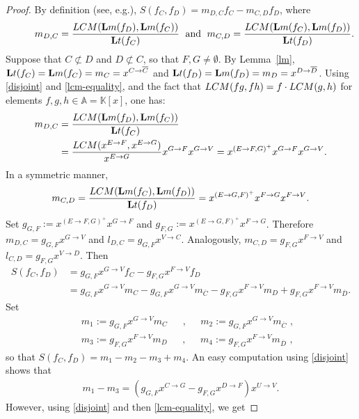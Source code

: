 \documentclass[10pt]{amsart}
\newcommand{\eg}{e.g.}
\newcommand{\mbk}{\mbox{$\mathbb{K}$}}
\newcommand{\mba}{\mbox{$\mathbb{A}$}}
\newcommand{\lm}{\mbox{${\bf L}{\rm m}$}}
\newcommand{\lt}{\mbox{${\bf L}{\rm t}$}}
\newcommand{\Lcm}{\mbox{${\rm LCM}$}}
\theoremstyle{definition}
\theoremstyle{remark}
\begin{document}
\begin{proof}
By definition (see, \eg \cite[\S~2.6, Definition~4]{clo}),
$S(f_C,f_D)=m_{D,C}f_C-m_{C,D}f_D$, where
\begin{eqnarray}\label{mdc}
\phantom{+++} m_{D,C}=\frac{\Lcm(\lm(f_D),\lm(f_C))}{\lt(f_C)}\;
\mbox{ and }\; m_{C,D}=\frac{\Lcm(\lm(f_C),\lm(f_D))}{\lt(f_D)}.
\end{eqnarray}
Suppose that $C\not\subset D$ and $D\not\subset C$, so that
$F,G\neq\emptyset$. By Lemma~\ref{lm},
$\lt(f_C)=\lm(f_C)=m_C=x^{C\to\overline{C}}$ and
$\lt(f_D)=\lm(f_D)=m_D=x^{D\to\overline{D}}$. Using \eqref{disjoint}
and \eqref{lcm-equality}, and the fact that $\Lcm(fg,fh)=f\cdot
\Lcm(g,h)$ for elements $f,g,h\in \mba=\mbk[x]$, one has:
\begin{align}\label{lcmCD/C}
m_{D,C} & =\frac{\Lcm(\lm(f_D),\lm(f_C))}{\lt(f_C)}\\ &=
  \frac{\Lcm(x^{E\to F},x^{E\to G})}{x^{E\to G}}x^{G\to F}x^{G\to
    V}=x^{(E\to F,G)^{+}}x^{G\to F}x^{G\to V}. \notag
\end{align}
In a symmetric manner,
\begin{eqnarray}\label{lcmCD/D}
m_{C,D}=\frac{\Lcm(\lm(f_C),\lm(f_D))}{\lt(f_D)}=x^{(E\to
  G,F)^{+}}x^{F\to G}x^{F\to V}.
\end{eqnarray}
Set $g_{G,F}:=x^{(E\to F,G)^{+}}x^{G\to F}$ and $g_{F,G}:=x^{(E\to
  G,F)^{+}}x^{F\to G}$. Therefore $m_{D,C}=g_{G,F}x^{G\to V}$ and
$l_{D,C}=g_{G,F}x^{V\to C}$. Analogously, $m_{C,D}=g_{F,G}x^{F\to V}$
and $l_{C,D}=g_{F,G}x^{V\to D}$. Then
\begin{align*}
 S(f_C,f_D)&=g_{G,F}x^{G\to V}f_C-g_{F,G}x^{F\to V}f_{D}\\
&= g_{G,F}x^{G\to V}m_C-g_{G,F}x^{G\to V}m_{\overline{C}}-
g_{F,G}x^{F\to V}m_{D}+g_{F,G}x^{F\to V}m_{\overline{D}}.
\end{align*}
Set
\begin{eqnarray*}
&&m_1:=g_{G,F}x^{G\to V}m_C\phantom{+}\mbox{ ,
  }\phantom{+}m_2:=g_{G,F}x^{G\to V}m_{\overline{C}}\mbox{ , }
  \\&&m_3:=g_{F,G}x^{F\to V}m_{D}\phantom{+}\mbox{ ,
  }\phantom{+}m_4:=g_{F,G}x^{F\to V}m_{\overline{D}}\mbox{ , }
\end{eqnarray*}
so that $S(f_C,f_D)=m_1-m_2-m_3+m_4$. An easy computation using
\eqref{disjoint} shows that
\begin{eqnarray*}
m_1-m_3=(g_{G,F}x^{C\to G}-g_{F,G}x^{D\to F})x^{U\to V}.
\end{eqnarray*}
However, using \eqref{disjoint} and then \eqref{lcm-equality}, we get

\end{proof}
\end{document}
